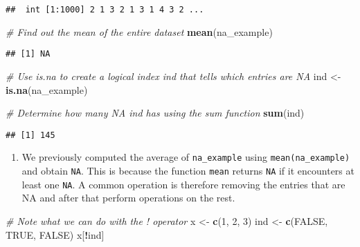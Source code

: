 \documentclass[
]{article}
\newenvironment{Shaded}{\begin{snugshade}}{\end{snugshade}}
\newcommand{\CommentTok}[1]{\textcolor[rgb]{0.56,0.35,0.01}{\textit{#1}}}
\newcommand{\DecValTok}[1]{\textcolor[rgb]{0.00,0.00,0.81}{#1}}
\newcommand{\KeywordTok}[1]{\textcolor[rgb]{0.13,0.29,0.53}{\textbf{#1}}}
\newcommand{\NormalTok}[1]{#1}
\newcommand{\OperatorTok}[1]{\textcolor[rgb]{0.81,0.36,0.00}{\textbf{#1}}}
\newcommand{\OtherTok}[1]{\textcolor[rgb]{0.56,0.35,0.01}{#1}}
\newcommand{\StringTok}[1]{\textcolor[rgb]{0.31,0.60,0.02}{#1}}
\providecommand{\tightlist}{%
  \setlength{\itemsep}{0pt}\setlength{\parskip}{0pt}}
\begin{document}
\begin{verbatim}
##  int [1:1000] 2 1 3 2 1 3 1 4 3 2 ...
\end{verbatim}

\begin{Shaded}
\begin{Highlighting}[]
\CommentTok{# Find out the mean of the entire dataset }
\KeywordTok{mean}\NormalTok{(na_example)}
\end{Highlighting}
\end{Shaded}

\begin{verbatim}
## [1] NA
\end{verbatim}

\begin{Shaded}
\begin{Highlighting}[]
\CommentTok{# Use is.na to create a logical index ind that tells which entries are NA}
\NormalTok{ind <-}\StringTok{ }\KeywordTok{is.na}\NormalTok{(na_example)}

\CommentTok{# Determine how many NA ind has using the sum function}
\KeywordTok{sum}\NormalTok{(ind)}
\end{Highlighting}
\end{Shaded}

\begin{verbatim}
## [1] 145
\end{verbatim}

\begin{enumerate}
\def\labelenumi{\arabic{enumi}.}
\setcounter{enumi}{7}
\tightlist
\item
  We previously computed the average of \texttt{na\_example} using
  \texttt{mean(na\_example)} and obtain \texttt{NA}. This is because the
  function \texttt{mean} returns \texttt{NA} if it encounters at least
  one \texttt{NA}. A common operation is therefore removing the entries
  that are NA and after that perform operations on the rest.
\end{enumerate}

\begin{Shaded}
\begin{Highlighting}[]
\CommentTok{# Note what we can do with the ! operator}
\NormalTok{x <-}\StringTok{ }\KeywordTok{c}\NormalTok{(}\DecValTok{1}\NormalTok{, }\DecValTok{2}\NormalTok{, }\DecValTok{3}\NormalTok{)}
\NormalTok{ind <-}\StringTok{ }\KeywordTok{c}\NormalTok{(}\OtherTok{FALSE}\NormalTok{, }\OtherTok{TRUE}\NormalTok{, }\OtherTok{FALSE}\NormalTok{)}
\NormalTok{x[}\OperatorTok{!}\NormalTok{ind]}
\end{Highlighting}
\end{Shaded}
\end{document}
